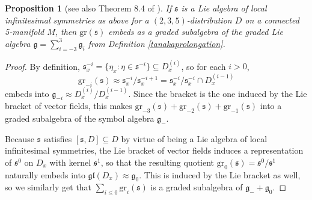 \documentclass[12pt,a4paper]{amsart}
\newtheorem{proposition}[theorem]{Proposition}
\theoremstyle{definition}
\begin{document}
\begin{proposition}[see also Theorem 8.4 of \cite{Tanaka1970}]\label{gradedimageprop} If $\mathfrak{s}$ is a Lie algebra of local infinitesimal symmetries as above for a $(2,3,5)$-distribution $D$ on a connected 5-manifold $M$, then $\mathrm{gr}(\mathfrak{s})$ embeds as a graded subalgebra of the graded Lie algebra $\mathfrak{g}=\sum_{i=-3}^3\mathfrak{g}_i$ from Definition \ref{tanakaprolongation}.\end{proposition}
\begin{proof}By definition, $\mathfrak{s}^{-i}_x=\{\eta_x:\eta\in\mathfrak{s}^{-i}\}\subseteq D^{(i)}_x$, so for each $i>0$,
\[\mathrm{gr}_{-i}(\mathfrak{s})\approx\mathfrak{s}^{-i}_x/\mathfrak{s}^{-i+1}_x=\mathfrak{s}^{-i}_x/\mathfrak{s}^{-i}_x\cap D^{(i-1)}_x\]
embeds into $\mathfrak{g}_{-i}\approx D^{(i)}_x/D^{(i-1)}_x$. Since the bracket is the one induced by the Lie bracket of vector fields, this makes $\mathrm{gr}_{-3}(\mathfrak{s})+\mathrm{gr}_{-2}(\mathfrak{s})+\mathrm{gr}_{-1}(\mathfrak{s})$ into a graded subalgebra of the symbol algebra $\mathfrak{g}_-$.

Because $\mathfrak{s}$ satisfies $[\mathfrak{s},D]\subseteq D$ by virtue of being a Lie algebra of local infinitesimal symmetries, the Lie bracket of vector fields induces a representation of $\mathfrak{s}^0$ on $D_x$ with kernel $\mathfrak{s}^1$, so that the resulting quotient $\mathrm{gr}_0(\mathfrak{s})=\mathfrak{s}^0/\mathfrak{s}^1$ naturally embeds into $\mathfrak{gl}(D_x)\approx\mathfrak{g}_0$. This is induced by the Lie bracket as well, so we similarly get that $\sum_{i\leq 0}\mathrm{gr}_i(\mathfrak{s})$ is a graded subalgebra of $\mathfrak{g}_-+\mathfrak{g}_0$.


\end{proof}
\end{document}
